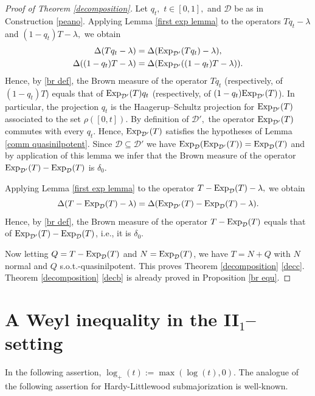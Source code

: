 \documentclass{amsart}
\theoremstyle{plain}
\theoremstyle{remark}
\begin{document}
\begin{proof}[Proof of Theorem \ref{decomposition}] Let $q_t,$ $t\in[0,1],$ and $\mathcal{D}$ be as in Construction \ref{peano}. Applying Lemma \ref{first exp lemma} to the operators $Tq_t-\lambda$ and $(1-q_t)T-\lambda,$ we obtain
\begin{align*}
\Delta(Tq_t-\lambda)&=\Delta({\rm Exp}_{\mathcal{D'}}(Tq_t)-\lambda), \\
\Delta((1-q_t)T-\lambda)&=\Delta({\rm Exp}_{\mathcal{D}'}((1-q_t)T-\lambda)).
\end{align*}
Hence, by \eqref{br def}, the Brown measure of the operator $Tq_t$ (respectively, of $(1-q_t)T$) equals that of ${\rm Exp}_{\mathcal{D}'}(T)q_t$ (respectively, of $(1-q_t){\rm Exp}_{\mathcal{D}'}(T)$). In particular, the projection $q_t$ is the Haagerup--Schultz projection for ${\rm Exp}_{\mathcal{D}'}(T)$ associated to the set $\rho([0,t]).$ By definition of $\mathcal{D}',$ the operator ${\rm Exp}_{\mathcal{D'}}(T)$ commutes with every $q_t.$ Hence, ${\rm Exp}_{\mathcal{D}'}(T)$ satisfies the hypotheses of Lemma \ref{comm quasinilpotent}. Since $\mathcal{D}\subseteq\mathcal{D}'$ we have ${\rm Exp}_{\mathcal{D}}({\rm Exp}_{\mathcal{D}'}(T))={\rm Exp}_{\mathcal{D}}(T)$ and by application of this lemma we infer that the Brown measure of the operator ${\rm Exp}_{\mathcal{D'}}(T)-{\rm Exp}_{\mathcal{D}}(T)$ is $\delta_0.$

Applying Lemma \ref{first exp lemma} to the operator $T-{\rm Exp}_{\mathcal{D}}(T)-\lambda,$ we obtain
$$\Delta(T-{\rm Exp}_{\mathcal{D}}(T)-\lambda)=\Delta({\rm Exp}_{\mathcal{D'}}(T)-{\rm Exp}_{\mathcal{D}}(T)-\lambda).$$
Hence, by \eqref{br def}, the Brown measure of the operator $T-{\rm Exp}_{\mathcal{D}}(T)$ equals that of ${\rm Exp}_{\mathcal{D'}}(T)-{\rm Exp}_{\mathcal{D}}(T)$, i.e., it is $\delta_0$.

Now letting $Q=T-{\rm Exp}_{\mathcal{D}}(T)$ and $N={\rm Exp}_{\mathcal{D}}(T)$, we have $T=N+Q$ with $N$ normal
and $Q$ s.o.t.-quasinilpotent. This proves Theorem \ref{decomposition} \eqref{decc}. Theorem \ref{decomposition} \eqref{decb} is already proved in Proposition \ref{br equ}.
\end{proof}


\section{A Weyl inequality in the II$_1$--setting}

In the following assertion, $\log_+(t):=\max(\log(t),0)$.
The analogue of the following assertion for Hardy-Littlewood submajorization is well-known.
\end{document}
